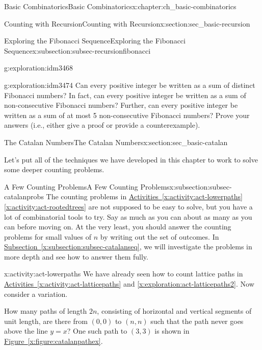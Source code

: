 \documentclass[oneside,10pt,]{book}
\numberwithin{equation}{chapter}
\begin{document}
\begin{chapterptx}{Basic Combinatorics}{}{Basic Combinatorics}{}{}{x:chapter:ch_basic-combinatorics}
\begin{sectionptx}{Counting with Recursion}{}{Counting with Recursion}{}{}{x:section:sec_basic-recursion}
\begin{subsectionptx}{Exploring the Fibonacci Sequence}{}{Exploring the Fibonacci Sequence}{}{}{x:subsection:subsec-recursionfibonacci}
\begin{exploration}{}{g:exploration:idm3468}
\end{exploration}
\begin{exploration}{}{g:exploration:idm3474}%
Can every positive integer be written as a sum of distinct Fibonacci numbers?  In fact, can every positive integer be written as a sum of non-consecutive Fibonacci numbers?  Further, can every positive integer be written as a sum of at most 5 non-consecutive Fibonacci numbers?  Prove your answers (i.e., either give a proof or provide a counterexample).%
\end{exploration}
\end{subsectionptx}
\end{sectionptx}
%
%
\typeout{************************************************}
\typeout{************************************************}
%
\begin{sectionptx}{The Catalan Numbers}{}{The Catalan Numbers}{}{}{x:section:sec_basic-catalan}
\begin{introduction}{}%
Let's put all of the techniques we have developed in this chapter to work to solve some deeper counting problems.%
\end{introduction}%
%
%
\typeout{************************************************}
\typeout{************************************************}
%
\begin{subsectionptx}{A Few Counting Problems}{}{A Few Counting Problems}{}{}{x:subsection:subsec-catalanprobs}
The counting problems in \hyperref[x:activity:act-lowerpaths]{Activities~\ref{x:activity:act-lowerpaths}\textendash{}\ref{x:activity:act-rootedtrees}} are not supposed to be easy to solve, but you have a lot of combinatorial tools to try.  Say as much as you can about as many as you can before moving on.  At the very least, you should answer the counting problems for small values of \(n\) by writing out the set of outcomes.  In \hyperref[x:subsection:subsec-catalanseq]{Subsection~\ref{x:subsection:subsec-catalanseq}}, we will investigate the problems in more depth and see how to answer them fully.%
\begin{activity}{}{x:activity:act-lowerpaths}%
We have already seen how to count lattice paths in \hyperref[x:activity:act-latticepaths]{Activities~\ref{x:activity:act-latticepaths}} and \hyperref[x:exploration:act-latticepaths2]{\ref{x:exploration:act-latticepaths2}}.  Now consider a variation.%
\par
How many paths of length \(2n\), consisting of horizontal and vertical segments of unit length, are there from \((0, 0)\) to \((n, n)\) such that the path never goes above the line \(y = x\)? One such path to \((3, 3)\) is shown in \hyperref[x:figure:catalanpathex]{Figure~\ref{x:figure:catalanpathex}}.%

\end{activity}
\end{subsectionptx}
\end{sectionptx}
\end{chapterptx}
\end{document}

